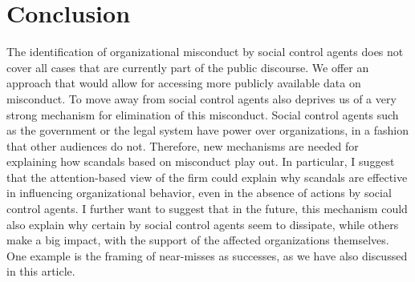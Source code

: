 \section{Conclusion}

The identification of organizational misconduct by social control agents does not cover all cases that are currently part of the public discourse. We offer an approach that would allow for accessing more publicly available data on misconduct. To move away from social control agents also deprives us of a very strong mechanism for elimination of this misconduct. Social control agents such as the government or the legal system have power over organizations, in a fashion that other audiences do not. Therefore, new mechanisms are needed for explaining how scandals based on misconduct play out. In particular, I suggest that the attention-based view of the firm could explain why scandals are effective in influencing organizational behavior, even in the absence of actions by social control agents. I further want to suggest that in the future, this mechanism could also explain why certain by social control agents seem to dissipate, while others make a big impact, with the support of the affected organizations themselves. One example is the framing of near-misses as successes, as we have also discussed in this article.